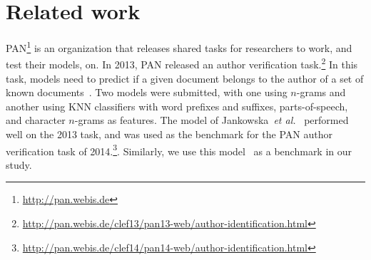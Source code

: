 \documentclass[11pt]{article}
\begin{document}
\section{Related work} \label{litReview}




PAN\footnote{\url{http://pan.webis.de}} is an organization that
releases shared tasks for researchers to work, and test their models,
on. In 2013, PAN released an author verification
task.\footnote{\url{http://pan.webis.de/clef13/pan13-web/author-identification.html}}
In this task, models need to predict if a given document belongs to
the author of a set of known documents~\cite{Stamatatos:2013}. Two
models were submitted, with one using $n$-grams and another using KNN
classifiers with word prefixes and suffixes, parts-of-speech, and
character $n$-grams as features.  The model of Jankowska~\emph{et
  al.}~\cite{jankowska2014} performed well on the 2013 task, and was
used as the benchmark for the PAN author verification task of
2014.\footnote{\url{http://pan.webis.de/clef14/pan14-web/author-identification.html}}.
Similarly, we use this model~\cite{jankowska2014} as a benchmark in
our study.
\end{document}
